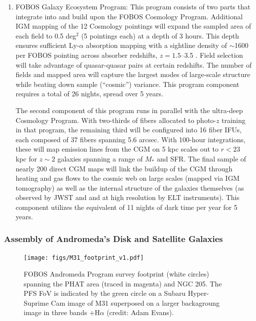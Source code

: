 \documentclass[oneside,11pt]{amsart}
\newcounter{chalno}
\newcommand{\chal}[1]{\refstepcounter{chalno}\label{#1}}
\begin{document}


\begin{enumerate}[rightmargin=0.2cm,leftmargin=0.2cm]
%
\chal{phot}
%
\item[] {\textsf {\large FOBOS Galaxy Ecosystem Program:}} This program consists of two parts that integrate into and build upon the FOBOS Cosmology Program.  Additional IGM mapping of the 12 Cosmology pointings will expand the sampled area of each field to 0.5 deg$^2$ (5 pointings each) at a depth of 3 hours.  This depth ensures sufficient Ly-$\alpha$ absorption mapping with a sightline density of $\sim$1600 per FOBOS pointing across absorber redshifts, $z = 1.5$--3.5 \citep[see][]{lee16}.  Field selection will take advantage of quasar-quasar pairs at certain redshifts.  The number of fields and mapped area will capture the largest modes of large-scale structure while beating down sample (``cosmic'') variance.  This program component requires a total of 26 nights, spread over 5 years.

The second component of this program runs in parallel with the ultra-deep Cosmology Program.  With two-thirds of fibers allocated to photo-$z$ training in that program, the remaining third will be configured into 16 fiber IFUs, each composed of 37 fibers spanning 5.6 arcsec.  With 100-hour integrations, these will map emission lines from the CGM on 5 kpc scales out to $r < 23$ kpc for $z \sim 2$ galaxies spanning a range of $M_*$ and SFR.  The final sample of nearly 200 direct CGM maps will link the buildup of the CGM through heating and gas flows to the cosmic web on large scales (mapped via IGM tomography) as well as the internal structure of the galaxies themselves (as observed by JWST and and at high resolution by ELT instruments).  This component utilizes the equivalent of 11 nights of dark time per year for 5 years.

%
\end{enumerate}


\subsubsection{Assembly of Andromeda's Disk and Satellite Galaxies}
\label{sec:localgroup}

\begin{figure}\small
%
\texttt{[image: figs/M31\_footprint\_v1.pdf]}
%
\caption{FOBOS Andromeda Program survey footprint (white circles) spanning the PHAT area (traced in magenta) and NGC 205.  The PFS FoV is indicated by the green circle on a Subaru Hyper-Suprime Cam image of M31 superposed on a larger backagroung image in three bands $+$H$\alpha$ (credit: Adam Evans).  }
%
\label{fig:M31}
%
\end{figure}
\end{document}
